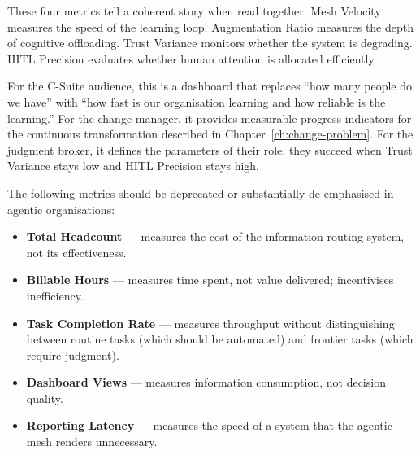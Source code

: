 These four metrics tell a coherent story when read together. Mesh Velocity measures the speed of the learning loop. Augmentation Ratio measures the depth of cognitive offloading. Trust Variance monitors whether the system is degrading. HITL Precision evaluates whether human attention is allocated efficiently.

For the C-Suite audience, this is a dashboard that replaces ``how many people do we have'' with ``how fast is our organisation learning and how reliable is the learning.'' For the change manager, it provides measurable progress indicators for the continuous transformation described in Chapter~\ref{ch:change-problem}. For the judgment broker, it defines the parameters of their role: they succeed when Trust Variance stays low and HITL Precision stays high.

\begin{keyinsight}[title={Abandoning Legacy KPIs}]
The following metrics should be deprecated or substantially de-emphasised in agentic organisations:
\begin{itemize}
  \item \textbf{Total Headcount} --- measures the cost of the information routing system, not its effectiveness.
  \item \textbf{Billable Hours} --- measures time spent, not value delivered; incentivises inefficiency.
  \item \textbf{Task Completion Rate} --- measures throughput without distinguishing between routine tasks (which should be automated) and frontier tasks (which require judgment).
  \item \textbf{Dashboard Views} --- measures information consumption, not decision quality.
  \item \textbf{Reporting Latency} --- measures the speed of a system that the agentic mesh renders unnecessary.
\end{itemize}
\end{keyinsight}
